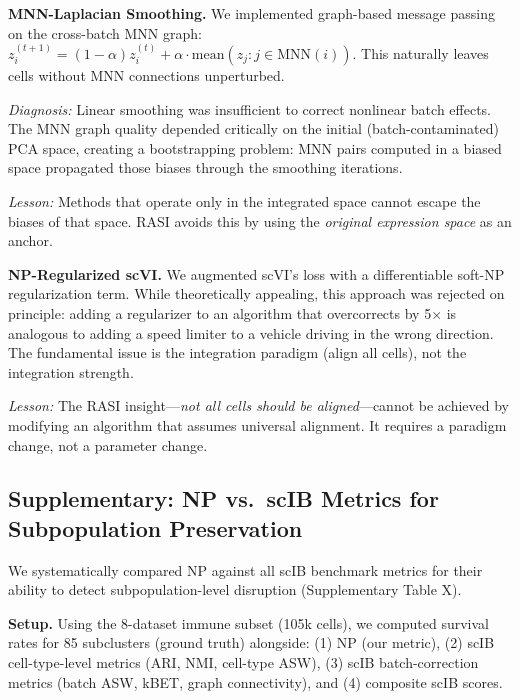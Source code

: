 \documentclass[10pt]{article}
\begin{document}
\textbf{MNN-Laplacian Smoothing.}
We implemented graph-based message passing on the cross-batch MNN graph: $z_i^{(t+1)} = (1-\alpha) z_i^{(t)} + \alpha \cdot \text{mean}(z_j : j \in \text{MNN}(i))$. This naturally leaves cells without MNN connections unperturbed.

\textit{Diagnosis:} Linear smoothing was insufficient to correct nonlinear batch effects. The MNN graph quality depended critically on the initial (batch-contaminated) PCA space, creating a bootstrapping problem: MNN pairs computed in a biased space propagated those biases through the smoothing iterations.

\textit{Lesson:} Methods that operate only in the integrated space cannot escape the biases of that space. RASI avoids this by using the \textit{original expression space} as an anchor.

\textbf{NP-Regularized scVI.}
We augmented scVI's loss with a differentiable soft-NP regularization term. While theoretically appealing, this approach was rejected on principle: adding a regularizer to an algorithm that overcorrects by 5$\times$ is analogous to adding a speed limiter to a vehicle driving in the wrong direction. The fundamental issue is the integration paradigm (align all cells), not the integration strength.

\textit{Lesson:} The RASI insight---\textit{not all cells should be aligned}---cannot be achieved by modifying an algorithm that assumes universal alignment. It requires a paradigm change, not a parameter change.


\subsection*{Supplementary: NP vs.\ scIB Metrics for Subpopulation Preservation}

We systematically compared NP against all scIB benchmark metrics for their ability to detect subpopulation-level disruption (Supplementary Table X).

\textbf{Setup.}
Using the 8-dataset immune subset (105k cells), we computed survival rates for 85 subclusters (ground truth) alongside: (1) NP (our metric), (2) scIB cell-type-level metrics (ARI, NMI, cell-type ASW), (3) scIB batch-correction metrics (batch ASW, kBET, graph connectivity), and (4) composite scIB scores.
\end{document}
